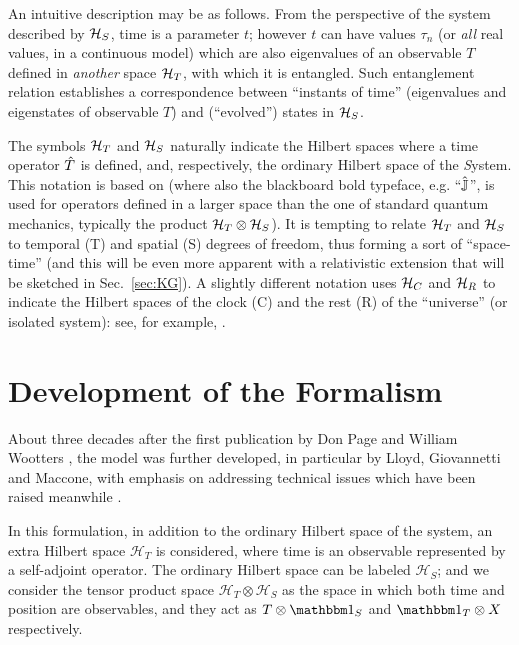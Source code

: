 An intuitive description may be as follows.
From the perspective of the system described by $\mathcal{H}_S$,
time is a parameter $t$;
however $t$ can have values
$\tau_n$ (or \emph{all} real values, in a continuous model)
which are also eigenvalues of an observable $T$ defined in \emph{another} space $\mathcal{H}_T$,
with which it is entangled. Such entanglement relation establishes a correspondence
between ``instants of time'' (eigenvalues and eigenstates of observable $T$)
and (``evolved'') states in $\mathcal{H}_S$.

The symbols $\mathcal{H}_T$ and $\mathcal{H}_S$
naturally indicate
the Hilbert spaces where a time operator $\hat{T}$ is defined,
and, respectively,
the ordinary Hilbert space of the \emph{S}ystem.
This notation is based on \citereset\cite{Lloyd:Time}
(where also the blackboard bold typeface, e.g. ``$\hat{\mathbb{J}}$'',
is used for operators defined in a larger space
than the one of standard quantum mechanics,
typically the product $\mathcal{H}_T \otimes \mathcal{H}_S$).
It is tempting to relate $\mathcal{H}_T$ and $\mathcal{H}_S$
to temporal (T) and spatial (S)
degrees of freedom, thus forming a sort of
``space-time'' (and this will be even more apparent
with a relativistic extension that will be sketched in Sec.~\ref{sec:KG}).
%
A slightly different notation
uses $\mathcal{H}_C$ and $\mathcal{H}_R$
to indicate the Hilbert spaces of the clock (C) and the rest (R) of the ``universe''
(or isolated system):
see, for example, \cite{Marletto:Evolution}.

\section{Development of the Formalism}\label{sec:pw:formalism}\label{sec:pw:theory_first}

About three decades after the first publication by
Don Page and William Wootters \parencite{PageWootters},
the model was further developed,
in particular by Lloyd, Giovannetti and Maccone,
with emphasis on addressing technical issues which have been raised meanwhile
\parencite{Lloyd:Time}.

In this formulation,
in addition to the ordinary Hilbert space of the system,
an extra Hilbert space $\mathcal{H}_T$ is considered,
where time is an observable
represented by a self-adjoint operator.
The ordinary Hilbert space can be labeled $\mathcal{H}_S$;
and we consider the tensor product space $\mathcal{H}_T \otimes \mathcal{H}_S$ as
the space in which both time and position are observables, and they act as
$T \otimes \idop_S$ and $\idop_T \otimes X$
respectively.

